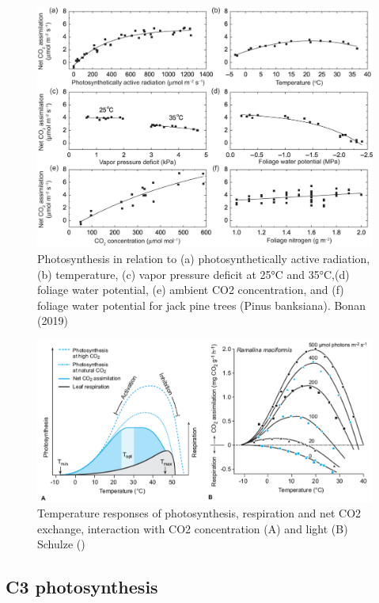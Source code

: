 \documentclass[12pt,oneside]{book}
\begin{document}
\begin{figure}

{\centering \includegraphics[width=0.8\linewidth]{figures/chap2/photosynthesis_obs} 

}

\caption{Photosynthesis in relation to (a) photosynthetically active radiation,(b) temperature, (c) vapor pressure deficit at 25°C and 35°C,(d) foliage water potential, (e) ambient CO2 concentration, and (f) foliage water potential for jack pine trees (Pinus banksiana). Bonan (2019)}\label{fig:f22}
\end{figure}

\begin{figure}

{\centering \includegraphics[width=0.8\linewidth]{figures/chap2/Trespons_interactions} 

}

\caption{Temperature responses of photosynthesis, respiration and net CO2 exchange, interaction with CO2 concentration (A) and light  (B)  Schulze ()}\label{fig:f23}
\end{figure}

\subsection{C3 photosynthesis}\label{c3-photosynthesis}
\end{document}
